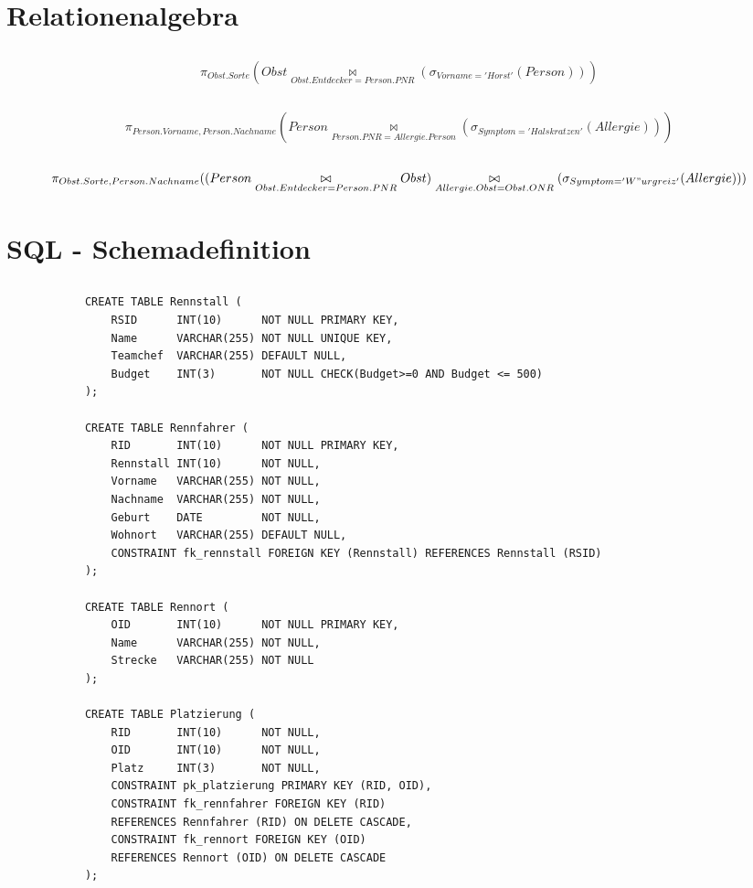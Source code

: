 \documentclass[ngerman]{gdb-aufgabenblatt}
\begin{document}
\section{Relationenalgebra}
	\subsection{} %
		\[
			\pi_{Obst.Sorte}(Obst \underset{Obst.Entdecker=Person.PNR}{\bowtie}( \sigma_{Vorname='Horst'}(Person)))
		\]
	\subsection{} %
		\[
			\pi_{Person.Vorname, Person.Nachname}(Person \underset{Person.PNR=Allergie.Person}{\bowtie} (\sigma_{Symptom='Halskratzen'}(Allergie)))
		\]
	\subsection{} %
		\[
			\pi_{Obst.Sorte, Person.Nachname}((Person \underset{Obst.Entdecker=Person.PNR}{\bowtie} Obst) \underset{Allergie.Obst=Obst.ONR}{\bowtie} (\sigma_{Symptom='W"urgreiz'}(Allergie)))
		\]
		
\section{SQL - Schemadefinition}
	\subsection{} %
		\begin{verbatim}
		    CREATE TABLE Rennstall (
		        RSID      INT(10)      NOT NULL PRIMARY KEY,
		        Name      VARCHAR(255) NOT NULL UNIQUE KEY,
		        Teamchef  VARCHAR(255) DEFAULT NULL,
		        Budget    INT(3)       NOT NULL CHECK(Budget>=0 AND Budget <= 500)
		    );
		    
		    CREATE TABLE Rennfahrer (
		        RID       INT(10)      NOT NULL PRIMARY KEY,
		        Rennstall INT(10)      NOT NULL,
		        Vorname   VARCHAR(255) NOT NULL,
		        Nachname  VARCHAR(255) NOT NULL,
		        Geburt    DATE         NOT NULL,
		        Wohnort   VARCHAR(255) DEFAULT NULL,
		        CONSTRAINT fk_rennstall FOREIGN KEY (Rennstall) REFERENCES Rennstall (RSID)
		    );
		    
		    CREATE TABLE Rennort (
		        OID       INT(10)      NOT NULL PRIMARY KEY,
		        Name      VARCHAR(255) NOT NULL,
		        Strecke   VARCHAR(255) NOT NULL
		    );
		    
		    CREATE TABLE Platzierung (
		        RID       INT(10)      NOT NULL,
		        OID       INT(10)      NOT NULL,
		        Platz     INT(3)       NOT NULL,
		        CONSTRAINT pk_platzierung PRIMARY KEY (RID, OID),
		        CONSTRAINT fk_rennfahrer FOREIGN KEY (RID) 
		        REFERENCES Rennfahrer (RID) ON DELETE CASCADE,
		        CONSTRAINT fk_rennort FOREIGN KEY (OID) 
		        REFERENCES Rennort (OID) ON DELETE CASCADE
		    );
		\end{verbatim}
\end{document}
